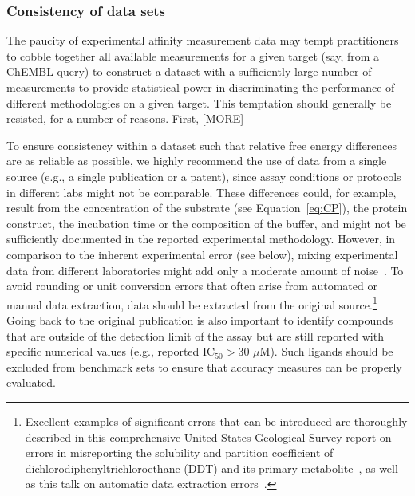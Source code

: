 \documentclass[9pt,bestpractices]{livecoms}
\begin{document}
\subsubsection{Consistency of data sets}
The paucity of experimental affinity measurement data may tempt practitioners to cobble together all available measurements for a given target (say, from a ChEMBL query) to construct a dataset with a sufficiently large number of measurements to provide statistical power in discriminating the performance of different methodologies on a given target.
This temptation should generally be resisted, for a number of reasons.
First, 
[MORE]

To ensure consistency within a dataset such that relative free energy differences are as reliable as possible, we highly recommend the use of data from a single source (e.g., a single publication or a patent), since assay conditions or protocols in different labs might not be comparable. 
These differences could, for example, result from the concentration of the substrate (see Equation~\ref{eq:CP}), the protein construct, the incubation time or the composition of the buffer, and might not be sufficiently documented in the reported experimental methodology. However, in comparison to the inherent experimental error (see below), mixing experimental data from different laboratories might add only a moderate amount of noise~\cite{kalliokoski_comparability_2013}.
To avoid rounding or unit conversion errors that often arise from automated or manual data extraction, data should be extracted from the original source.\footnote{Excellent examples of significant errors that can be introduced are thoroughly described in this comprehensive United States Geological Survey report on errors in misreporting the solubility and partition coefficient of dichlorodiphenyltrichloroethane (DDT) and its primary metabolite~\cite{pontolillo2001search}, as well as this talk on automatic data extraction errors~\cite{daga_pankaj_r_2019_3445476}.}
Going back to the original publication is also important to identify compounds that are outside of the detection limit of the assay but are still reported with specific numerical values (e.g., reported IC$_{50} > 30 \,\,\mu$M). Such ligands should be excluded from benchmark sets to ensure that accuracy measures can be properly evaluated.
\end{document}

